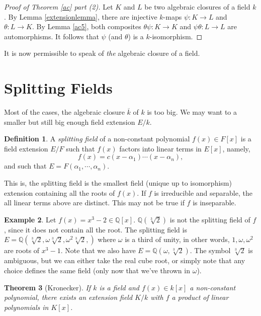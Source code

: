 \documentclass[12pt]{report}
\newtheorem{theorem}{Theorem}[section]
\theoremstyle{definition}
\newtheorem{definition}[theorem]{Definition}
\newtheorem{example}[theorem]{Example}
\newcommand{\QQ}{\mathbb{Q}}
\begin{document}
\begin{proof}[Proof of Theorem \ref{ac} part (2)]
	Let $K$ and $L$ be two algebraic closures of a field $k$. By Lemma \ref{extensionlemma}, there are injective $k$-maps $\psi : K \to L$ and $\theta : L \to K$. By Lemma \ref{ac5}, both composites $\theta \psi : K \to K$ and $\psi \theta : L \to L$ are automorphisms. It follows that $\psi$ (and $\theta$) is a $k$-isomorphism.
\end{proof}

It is now permissible to speak of \emph{the} algebraic closure of a field.

\section{Splitting Fields}

Most of the cases, the algebraic closure $\overline{k}$ of $k$ is too big. We may want to a smaller but still big enough field extension $E/k$.

\begin{definition}
	A \emph{splitting field} of a non-constant polynomial $f(x)\in F[x]$ is a field extension $E/F$ such that $f(x)$ factors into linear terms in $E[x]$, namely, $$f(x)=c(x-\alpha_1)\cdots(x-\alpha_n),$$
	and such that $E=F(\alpha_1,\cdots,\alpha_n)$.
\end{definition}

This is, the splitting field is the smallest field (unique up to isomorphism) extension containing all the roots of $f(x)$. If $f$ is irreducible and separable, the all linear terms above are distinct. This may not be true if $f$ is inseparable.

\begin{example}
	Let $f(x)=x^3-2\in\QQ[x]$. $\QQ(\sqrt[3]{2})$ is not the splitting field of $f$, since it does not contain all the root. The splitting field is $E=\QQ(\sqrt[3]{2},\omega\sqrt[3]{2},\omega^2\sqrt[3]{2},)$ where $\omega$ is a third of unity, in other words, $1,\omega,\omega^2$ are roots of $x^3-1$. Note that we also have $E=\QQ(\omega,\sqrt[3]{2})$. The symbol $\sqrt[3]{2}$ is ambiguous, but we can either take the real cube root, or simply note that any choice defines the same field (only now that we've thrown in $\omega$).
\end{example}

\begin{theorem}[Kronecker]
	If $k$ is a field and $f(x)\in k[x]$ a non-constant polynomial, there exists an extension field $K/k$ with $f$ a product of linear polynomials in $K[x]$.
\end{theorem}
\end{document}
